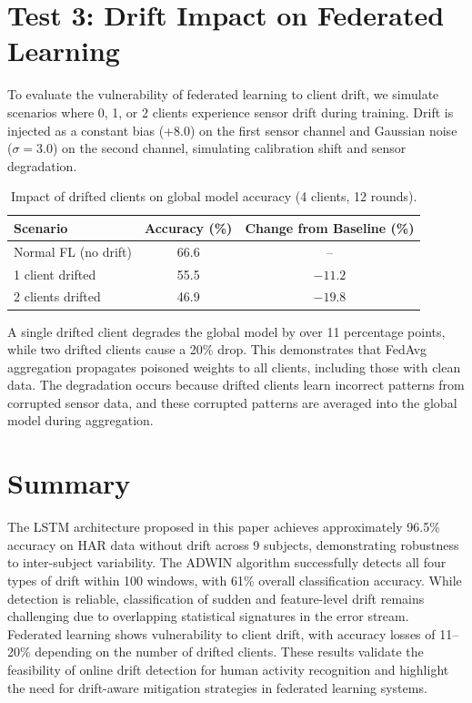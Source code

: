 \section{Test 3: Drift Impact on Federated Learning}

To evaluate the vulnerability of federated learning to client drift, we simulate scenarios where 0, 1, or 2 clients experience sensor drift during training. Drift is injected as a constant bias (+8.0) on the first sensor channel and Gaussian noise ($\sigma=3.0$) on the second channel, simulating calibration shift and sensor degradation.

\begin{table}[ht]
\centering
\caption{Impact of drifted clients on global model accuracy (4 clients, 12 rounds).}
\label{tab:fl_drift}
\begin{tabular}{lcc}
\toprule
\textbf{Scenario} & \textbf{Accuracy (\%)} & \textbf{Change from Baseline (\%)} \\
\midrule
Normal FL (no drift)     & 66.6 & -- \\
1 client drifted         & 55.5 & $-11.2$ \\
2 clients drifted        & 46.9 & $-19.8$ \\
\bottomrule
\end{tabular}
\end{table}

A single drifted client degrades the global model by over 11 percentage points, while two drifted clients cause a 20\% drop. This demonstrates that FedAvg aggregation propagates poisoned weights to all clients, including those with clean data. The degradation occurs because drifted clients learn incorrect patterns from corrupted sensor data, and these corrupted patterns are averaged into the global model during aggregation.

\section{Summary}

The LSTM architecture proposed in this paper achieves approximately 96.5\% accuracy on HAR data without drift across 9 subjects, demonstrating robustness to inter-subject variability. The ADWIN algorithm successfully detects all four types of drift within 100 windows, with 61\% overall classification accuracy. While detection is reliable, classification of sudden and feature-level drift remains challenging due to overlapping statistical signatures in the error stream. Federated learning shows vulnerability to client drift, with accuracy losses of 11--20\% depending on the number of drifted clients. These results validate the feasibility of online drift detection for human activity recognition and highlight the need for drift-aware mitigation strategies in federated learning systems.
